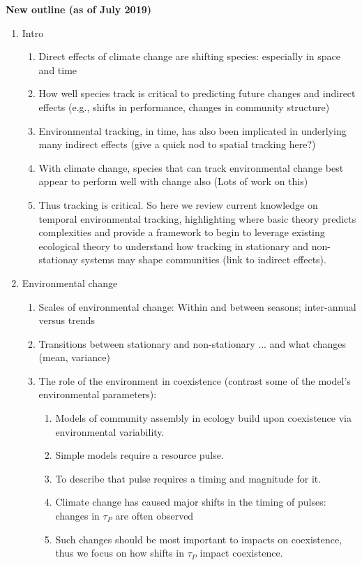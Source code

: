 \documentclass[11pt,letterpaper]{article}
\begin{document}
{\bf New outline (as of July 2019)} 
\begin{enumerate}
\item Intro
\begin{enumerate}
\item Direct effects of climate change are shifting species: especially in space and time 
\item How well species track is critical to predicting future changes and indirect effects (e.g., shifts in performance, changes in community structure) 
\item Environmental tracking, in time, has also been implicated in underlying many indirect effects (give a quick nod to spatial tracking here?)
\item With climate change, species that can track environmental change best appear to perform well with change also (Lots of work on this)
\item Thus tracking is critical. So here we review current knowledge on temporal environmental tracking, highlighting where basic theory predicts complexities and provide a framework to begin to leverage existing ecological theory to understand how tracking in stationary and non-stationay systems may shape communities (link to indirect effects).
\end{enumerate}
\item Environmental change
\begin{enumerate}
\item Scales of environmental change: Within and between seasons; inter-annual versus trends
\item Transitions between stationary and non-stationary ... and what changes (mean, variance) 
\item The role of the environment in coexistence (contrast some of the model's environmental parameters):
\begin{enumerate}
\item Models of community assembly in ecology build upon coexistence via environmental variability. %
\item Simple models require a resource pulse. 
\item To describe that pulse requires a timing and magnitude for it.  %
\item Climate change has caused major shifts in the timing of pulses: changes in $\tau_{P}$ are often observed 
\item Such changes should be most important to impacts on coexistence, thus we focus on how shifts in $\tau_{P}$ impact coexistence.

\end{enumerate}
\end{enumerate}
\end{enumerate}
\end{document}
